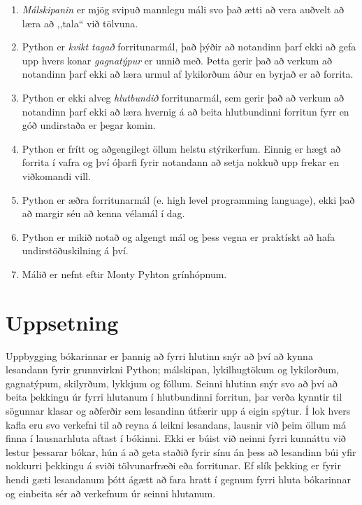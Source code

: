 \begin{enumerate}
	\item \textit{Málskipanin} er mjög svipuð mannlegu máli svo það ætti að vera auðvelt að læra að ,,tala“ við tölvuna.
	\item  Python er \textit{kvikt tagað} forritunarmál, það þýðir að notandinn þarf ekki að gefa upp hvers konar \textit{gagnatýpur} er unnið með. 
	Þetta gerir það að verkum að notandinn þarf ekki að læra urmul af lykilorðum áður en byrjað er að forrita.
	\item  Python er ekki alveg \textit{hlutbundið} forritunarmál, sem gerir það að verkum að notandinn þarf ekki að læra hvernig á að beita hlutbundinni forritun fyrr en góð undirstaða er þegar komin.
	\item Python er frítt og aðgengilegt öllum helstu stýrikerfum.
	Einnig er hægt að forrita í vafra og því óþarfi fyrir notandann að setja nokkuð upp frekar en viðkomandi vill.
	\item Python er æðra forritunarmál (e. high level programming language), ekki það að margir séu að kenna vélamál í dag.
	\item Python er mikið notað og algengt mál og þess vegna er praktískt að hafa undirstöðuskilning á því.
	\item Málið er nefnt eftir Monty Pyhton grínhópnum.
\end{enumerate}

\section{Uppsetning}
Uppbygging bókarinnar er þannig að fyrri hlutinn snýr að því að kynna lesandann fyrir grunnvirkni Python; málskipan, lykilhugtökum og lykilorðum, gagnatýpum, skilyrðum, lykkjum og föllum.
Seinni hlutinn snýr svo að því að beita þekkingu úr fyrri hlutanum í hlutbundinni forritun, þar verða kynntir til sögunnar klasar og aðferðir sem lesandinn útfærir upp á eigin spýtur.
Í lok hvers kafla eru svo verkefni til að reyna á leikni lesandans, lausnir við þeim öllum má finna í lausnarhluta aftast í bókinni.
Ekki er búist við neinni fyrri kunnáttu við lestur þessarar bókar, hún á að geta staðið fyrir sínu án þess að lesandinn búi yfir nokkurri þekkingu á sviði tölvunarfræði eða forritunar.
Ef slík þekking er fyrir hendi gæti lesandanum þótt ágætt að fara hratt í gegnum fyrri hluta bókarinnar og einbeita sér að verkefnum úr seinni hlutanum.

